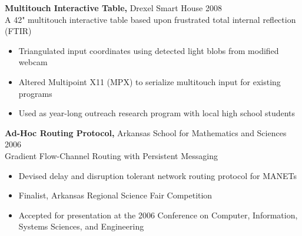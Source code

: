 \documentclass[margin]{res}
\begin{document}
\begin{resume}
\begin{software}
{\bf Multitouch Interactive Table,} Drexel Smart House \hfill 2008 \\
A 42" multitouch interactive table based upon frustrated total internal reflection (FTIR)
\begin{itemize} \itemsep -2pt %
\item Triangulated input coordinates using detected light blobs from modified webcam
\item Altered Multipoint X11 (MPX) to serialize multitouch input for existing programs
\item Used as year-long outreach research program with local high school students
\end{itemize}
\end{software}

\begin{telecom}
{\bf Ad-Hoc Routing Protocol,} Arkansas School for Mathematics and Sciences \hfill 2006 \\
Gradient Flow-Channel Routing with Persistent Messaging
\begin{itemize} \itemsep -2pt %
\item Devised delay and disruption tolerant network routing protocol for MANETs
\item Finalist, Arkansas Regional Science Fair Competition
\item Accepted for presentation at the 2006 Conference on Computer, Information, Systems Sciences, and Engineering
\end{itemize}
\end{telecom}

\end{resume} 
\end{document}
